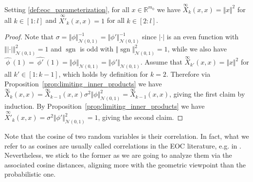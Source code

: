 \documentclass[twoside,11pt]{article}
\newcommand{\R}{\mathbb{R}}
\newcommand{\dual}[1]{\widehat{\ #1 \ }}
\newcommand{\limiting}[1]{\overset{\scriptscriptstyle\infty}{#1}}
\DeclareMathOperator{\sgn}{sgn}
\begin{document}
\begin{proposition}\label{prop:eoc_properties}~\\
Setting \eqref{def:eoc_parameterization}, for all $x \in \R^{m_0}$ we have $\limiting{X}_k(x,x) = \Vert x \Vert^2$ for all $k \in [1:l]$ and $\limiting{X'}_k(x,x) = 1$ for all $k \in [2:l]$.
\end{proposition}
\begin{proof}
Note that $\sigma = \Vert \phi \Vert_{\mathcal{N}(0,1)}^{-1} = \Vert \phi' \Vert_{\mathcal{N}(0,1)}^{-1}$ since $\vert\cdot\vert$ is an even function with $\Vert \vert\cdot\vert \Vert_{\mathcal{N}(0,1)}^2=1$ and $\sgn$ is odd with $\Vert \sgn \Vert_{\mathcal{N}(0,1)}^2=1$, while we also have $\dual{\phi}(1) = \dual{\phi'}(1) = \Vert \phi \Vert_{\mathcal{N}(0,1)} = \Vert \phi' \Vert_{\mathcal{N}(0,1)}$. Assume that $\limiting{X}_{k'}(x,x) = \Vert x \Vert^2$ for all $k' \in [1:k-1]$, which holds by definition for $k=2$. Therefore via Proposition~\ref{prop:limiting_inner_products} we have $\limiting{X}_k(x,x) = \limiting{X}_{k-1}(x,x) \sigma^2 \Vert \phi \Vert_{\mathcal{N}(0,1)}^2 = \limiting{X}_{k-1}(x,x)$, giving the first claim by induction. By Proposition~\ref{prop:limiting_inner_products} we have $\limiting{X'}_k(x,x) = \sigma^2 \Vert \phi' \Vert_{\mathcal{N}(0,1)}^2 = 1$, giving the second claim.
\end{proof}

Note that the cosine of two random variables is their correlation. In fact, what we refer to as cosines are usually called correlations in the EOC literature, e.g. in \citet{Hayouetal2019}. Nevertheless, we stick to the former as we are going to analyze them via the associated cosine distances, aligning more with the geometric viewpoint than the probabilistic one.
\end{document}
